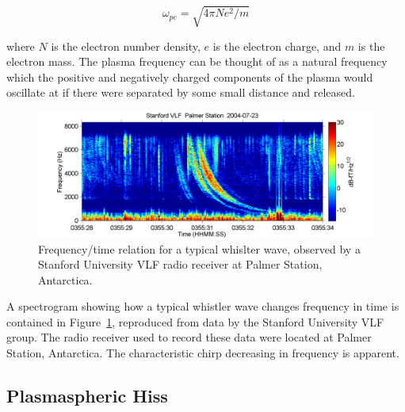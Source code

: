 $$\omega_{pe} = \sqrt{4\pi N e^2/m}$$

where $N$ is the electron number density, $e$ is the electron charge, and $m$ is the electron mass. The plasma frequency can be thought of as a natural frequency which the positive and negatively charged components of the plasma would oscillate at if there were separated by some small distance and released. 

\begin{figure}[p]
\label{whistler_spectrogram}
\centering
\includegraphics[width=1.0\textwidth,angle=0]{figures/chapter_2/whistler/Whistler_radio_palmer_2004-07-23_T035528.png}
\caption{Frequency/time relation for a typical whislter wave, observed by a Stanford University VLF radio receiver at Palmer Station, Antarctica.}
\end{figure}

A spectrogram showing how a typical whistler wave changes frequency in time is contained in Figure~\ref{whistler_spectrogram}, reproduced from data by the Stanford University VLF group. The radio receiver used to record these data were located at Palmer Station, Antarctica. The characteristic chirp decreasing in frequency is apparent. 

\subsection{Plasmaspheric Hiss}

